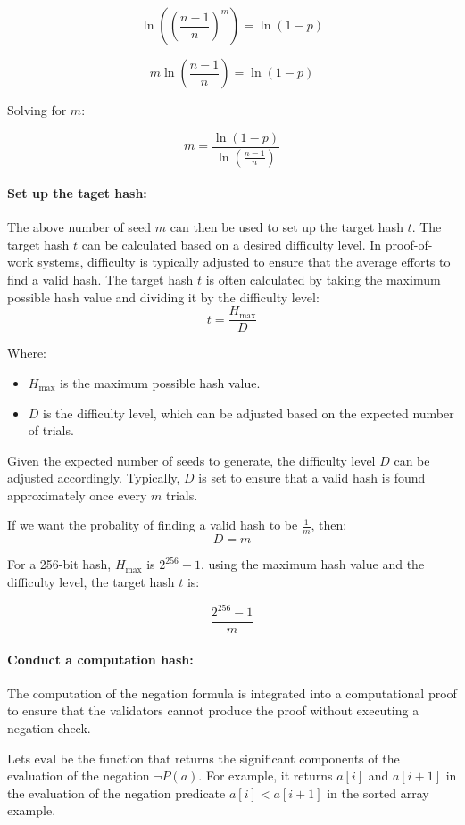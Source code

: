 \documentclass[runningheads]{llncs}
\begin{document}
\[
\ln\left(\left(\frac{n-1}{n}\right)^m\right) = \ln(1 - p)
\]

\[
m \ln\left(\frac{n-1}{n}\right) = \ln(1 - p)
\]

Solving for \( m \):

\[
m = \frac{\ln(1 - p)}{\ln\left(\frac{n-1}{n}\right)}
\]

\paragraph{Set up the taget hash:}
The above number of seed $m$ can then be used to set up the target hash $t$. The target hash $t$ can be calculated based on a desired difficulty level. In proof-of-work systems, difficulty is typically adjusted to ensure that the average efforts to find a valid hash. The target hash $t$ is often calculated by taking the maximum possible hash value and dividing it by the difficulty level:
\[
t = \frac{H_{\text{max}}}{D}
\]

Where:
\begin{itemize}
  \item \( H_{\text{max}} \) is the maximum possible hash value.
  \item \( D \) is the difficulty level, which can be adjusted based on the expected number of trials.
\end{itemize}


Given the expected number of seeds to generate, 
the difficulty level $D$ can be adjusted accordingly. Typically, $D$ is set to ensure that a valid hash is found approximately once every $m$ trials.

If we want the probality of finding a valid hash to be $\frac{1}{m}$, then:
\[
D=m
\]

For a 256-bit hash, $H_{\text{max}}$ is $2^{256} - 1 $.  using the maximum hash value and the difficulty level, the target hash $t$ is:
    
\[
\frac{2^{256} - 1}{m}
\]
\paragraph{Conduct a computation hash:} The computation of the negation formula is integrated into a computational proof to ensure that the validators cannot produce the proof without executing a negation check.

Lets \(\text{eval}\) be the function that returns the significant components of the evaluation of the negation \(\neg P(a)\).  For example, it returns \(a[i]\) and \(a[i + 1]\) in the evaluation of the negation predicate \(a[i] < a[i+1]\) in the sorted array example.
\end{document}

